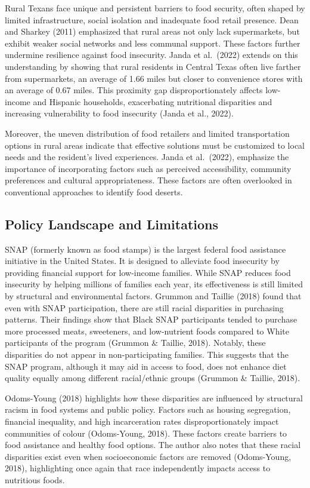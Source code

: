 \documentclass[]{article}
\begin{document}
Rural Texans face unique and persistent barriers to food security, often
shaped by limited infrastructure, social isolation and inadequate food
retail presence. Dean and Sharkey (2011) emphasized that rural areas not
only lack supermarkets, but exhibit weaker social networks and less
communal support. These factors further undermine resilience against
food insecurity. Janda et al.~(2022) extends on this understanding by
showing that rural residents in Central Texas often live farther from
supermarkets, an average of 1.66 miles but closer to convenience stores
with an average of 0.67 miles. This proximity gap disproportionately
affects low-income and Hispanic households, exacerbating nutritional
disparities and increasing vulnerability to food insecurity (Janda et
al., 2022).

Moreover, the uneven distribution of food retailers and limited
transportation options in rural areas indicate that effective solutions
must be customized to local needs and the resident's lived experiences.
Janda et al.~(2022), emphasize the importance of incorporating factors
such as perceived accessibility, community preferences and cultural
appropriateness. These factors are often overlooked in conventional
approaches to identify food deserts.

\subsection{Policy Landscape and
Limitations}\label{policy-landscape-and-limitations}

SNAP (formerly known as food stamps) is the largest federal food
assistance initiative in the United States. It is designed to alleviate
food insecurity by providing financial support for low-income families.
While SNAP reduces food insecurity by helping millions of families each
year, its effectiveness is still limited by structural and environmental
factors. Grummon and Taillie (2018) found that even with SNAP
participation, there are still racial disparities in purchasing
patterns. Their findings show that Black SNAP participants tended to
purchase more processed meats, sweeteners, and low-nutrient foods
compared to White participants of the program (Grummon \& Taillie,
2018). Notably, these disparities do not appear in non-participating
families. This suggests that the SNAP program, although it may aid in
access to food, does not enhance diet quality equally among different
racial/ethnic groups (Grummon \& Taillie, 2018).

Odoms-Young (2018) highlights how these disparities are influenced by
structural racism in food systems and public policy. Factors such as
housing segregation, financial inequality, and high incarceration rates
disproportionately impact communities of colour (Odoms-Young, 2018).
These factors create barriers to food assistance and healthy food
options. The author also notes that these racial disparities exist even
when socioeconomic factors are removed (Odoms-Young, 2018), highlighting
once again that race independently impacts access to nutritious foods.
\end{document}
